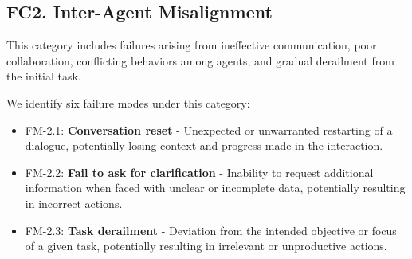 \subsection{FC2. Inter-Agent Misalignment}

This category includes failures arising from ineffective communication, poor collaboration, conflicting behaviors among agents, and gradual derailment from the initial task.

We identify six failure modes under this category:

\begin{itemize}

\item FM-2.1: \textbf{Conversation reset} - Unexpected or unwarranted restarting of a dialogue, potentially losing context and progress made in the interaction.

\item FM-2.2: \textbf{Fail to ask for clarification} - Inability to request additional information when faced with unclear or incomplete data, potentially resulting in incorrect actions.

\item FM-2.3: \textbf{Task derailment} - Deviation from the intended objective or focus of a given task, potentially resulting in irrelevant or unproductive actions.


\end{itemize}
